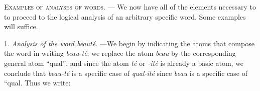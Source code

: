 \begin{sloppypar}
{  \noindent
  {\small {\setlength{\tabcolsep}{1pt}
    } }

  \textsc{Examples of analyses of words}. --- We now have all of the
  elements necessary to to proceed to the logical analysis of an
  arbitrary specific word. Some examples will suffice.

  1. \emph{Analysis of the word \emph{beauté}}. ---We begin by
  indicating the atoms that compose the word in writing \emph{beau-té};
  we replace the atom \emph{beau} by the corresponding general atom
  ``qual'', and since the atom \emph{té} or \emph{-ité} is already a
  basic atom, we conclude that \emph{beau-té} is a specific case of
  \emph{qual-ité} since \emph{beau} is a specific case of ``qual. Thus we
  write:
  

}

\end{sloppypar}
